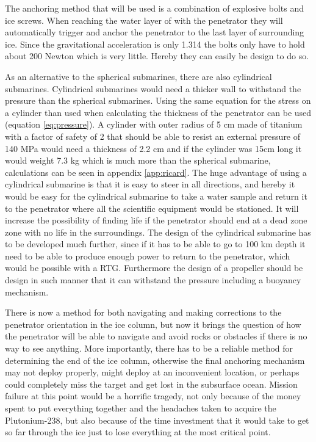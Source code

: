 

The anchoring method that will be used is a combination of explosive bolts and ice screws. When reaching the water layer of with the penetrator they will automatically trigger and anchor the penetrator to the last layer of surrounding ice. Since the gravitational acceleration is only 1.314 the bolts only have to hold about 200 Newton which is very little. Hereby they can easily be design to do so.



As an alternative to the spherical submarines, there are also cylindrical submarines. Cylindrical submarines would need a thicker wall to withstand the pressure than the spherical submarines. Using the same equation for the stress on a cylinder than used when calculating the thickness of the penetrator can be used (equation \ref{eq:pressure}). A cylinder with outer radius of 5 cm made of titanium with a factor of safety of 2 that should be able to resist an external pressure of 140 MPa would need a thickness of 2.2 cm and if the cylinder was 15cm long it would weight 7.3 kg which is much more than the spherical submarine, calculations can be seen in appendix \ref{app:ricard}. The huge advantage of using a cylindrical submarine is that it is easy to steer in all directions, and hereby it would be easy for the cylindrical submarine to take a water sample and return it to the penetrator where all the scientific equipment would be stationed. It will increase the possibility of finding life if the penetrator should end at a dead zone zone with no life in the surroundings. The design of the cylindrical submarine has to be developed much further, since if it has to be able to go to 100 km depth it need to be able to produce enough power to return to the penetrator, which would be possible with a RTG. Furthermore the design of a propeller should be design in such manner that it can withstand the pressure including a buoyancy mechanism.


There is now a method for both navigating and making corrections to the penetrator orientation in the ice column, but now it brings the question of how the penetrator will be able to navigate and avoid rocks or obstacles if there is no way to see anything. More importantly, there has to be a reliable method for determining the end of the ice column, otherwise the final anchoring mechanism may not deploy properly, might deploy at an inconvenient location, or perhaps could completely miss the target and get lost in the subsurface ocean. Mission failure at this point would be a horrific tragedy, not only because of the money spent to put everything together and the headaches taken to acquire the Plutonium-238, but also because of the time investment that it would take to get so far through the ice just to lose everything at the most critical point.

